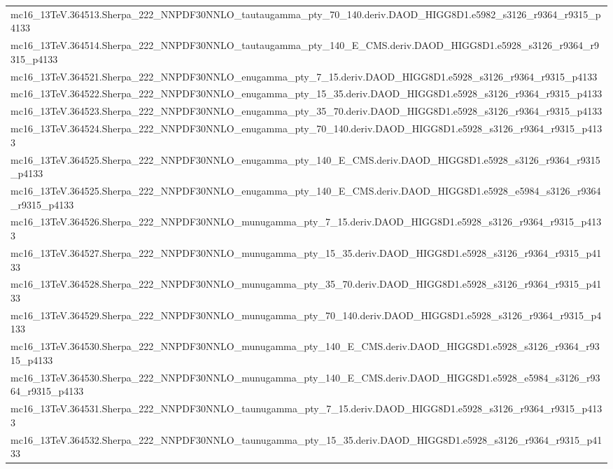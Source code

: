 \begin{adjustwidth}{-3em}{-3em}
\begin{longtable}{l}
mc16\_13TeV.364513.Sherpa\_222\_NNPDF30NNLO\_tautaugamma\_pty\_70\_140.deriv.DAOD\_HIGG8D1.e5982\_s3126\_r9364\_r9315\_p4133 \\
mc16\_13TeV.364514.Sherpa\_222\_NNPDF30NNLO\_tautaugamma\_pty\_140\_E\_CMS.deriv.DAOD\_HIGG8D1.e5928\_s3126\_r9364\_r9315\_p4133 \\
mc16\_13TeV.364521.Sherpa\_222\_NNPDF30NNLO\_enugamma\_pty\_7\_15.deriv.DAOD\_HIGG8D1.e5928\_s3126\_r9364\_r9315\_p4133 \\
mc16\_13TeV.364522.Sherpa\_222\_NNPDF30NNLO\_enugamma\_pty\_15\_35.deriv.DAOD\_HIGG8D1.e5928\_s3126\_r9364\_r9315\_p4133 \\
mc16\_13TeV.364523.Sherpa\_222\_NNPDF30NNLO\_enugamma\_pty\_35\_70.deriv.DAOD\_HIGG8D1.e5928\_s3126\_r9364\_r9315\_p4133 \\
mc16\_13TeV.364524.Sherpa\_222\_NNPDF30NNLO\_enugamma\_pty\_70\_140.deriv.DAOD\_HIGG8D1.e5928\_s3126\_r9364\_r9315\_p4133 \\
mc16\_13TeV.364525.Sherpa\_222\_NNPDF30NNLO\_enugamma\_pty\_140\_E\_CMS.deriv.DAOD\_HIGG8D1.e5928\_s3126\_r9364\_r9315\_p4133 \\
mc16\_13TeV.364525.Sherpa\_222\_NNPDF30NNLO\_enugamma\_pty\_140\_E\_CMS.deriv.DAOD\_HIGG8D1.e5928\_e5984\_s3126\_r9364\_r9315\_p4133 \\
mc16\_13TeV.364526.Sherpa\_222\_NNPDF30NNLO\_munugamma\_pty\_7\_15.deriv.DAOD\_HIGG8D1.e5928\_s3126\_r9364\_r9315\_p4133 \\
mc16\_13TeV.364527.Sherpa\_222\_NNPDF30NNLO\_munugamma\_pty\_15\_35.deriv.DAOD\_HIGG8D1.e5928\_s3126\_r9364\_r9315\_p4133 \\
mc16\_13TeV.364528.Sherpa\_222\_NNPDF30NNLO\_munugamma\_pty\_35\_70.deriv.DAOD\_HIGG8D1.e5928\_s3126\_r9364\_r9315\_p4133 \\
mc16\_13TeV.364529.Sherpa\_222\_NNPDF30NNLO\_munugamma\_pty\_70\_140.deriv.DAOD\_HIGG8D1.e5928\_s3126\_r9364\_r9315\_p4133 \\
mc16\_13TeV.364530.Sherpa\_222\_NNPDF30NNLO\_munugamma\_pty\_140\_E\_CMS.deriv.DAOD\_HIGG8D1.e5928\_s3126\_r9364\_r9315\_p4133 \\
mc16\_13TeV.364530.Sherpa\_222\_NNPDF30NNLO\_munugamma\_pty\_140\_E\_CMS.deriv.DAOD\_HIGG8D1.e5928\_e5984\_s3126\_r9364\_r9315\_p4133 \\
mc16\_13TeV.364531.Sherpa\_222\_NNPDF30NNLO\_taunugamma\_pty\_7\_15.deriv.DAOD\_HIGG8D1.e5928\_s3126\_r9364\_r9315\_p4133 \\
mc16\_13TeV.364532.Sherpa\_222\_NNPDF30NNLO\_taunugamma\_pty\_15\_35.deriv.DAOD\_HIGG8D1.e5928\_s3126\_r9364\_r9315\_p4133 \\

\end{longtable}
\end{adjustwidth}
